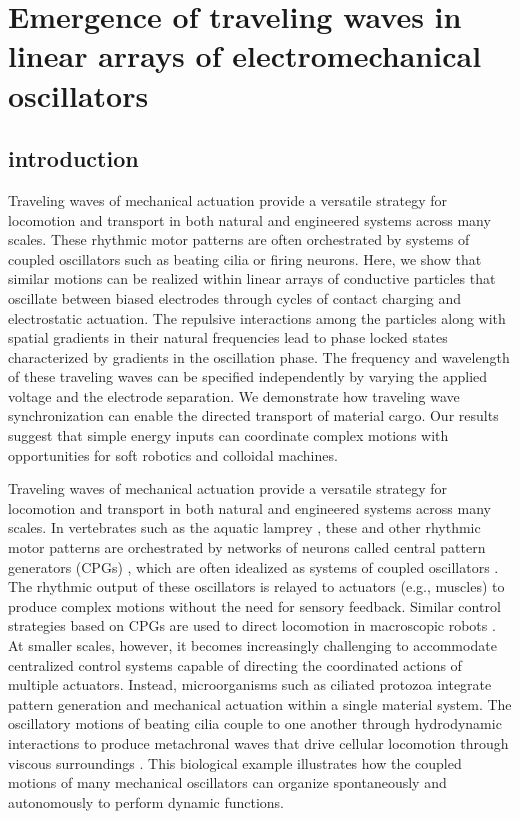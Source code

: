 \chapter{Emergence of traveling waves in linear arrays of electromechanical oscillators}




\section{introduction}
Traveling waves of mechanical actuation provide a versatile strategy for locomotion and transport in both natural and engineered systems across many scales. These rhythmic motor patterns are often orchestrated by systems of coupled oscillators such as beating cilia or firing neurons. Here, we show that similar motions can be realized within linear arrays of conductive particles that oscillate between biased electrodes through cycles of contact charging and electrostatic actuation. The repulsive interactions among the particles along with spatial gradients in their natural frequencies lead to phase locked states characterized by gradients in the oscillation phase. The frequency and wavelength of these traveling waves can be specified independently by varying the applied voltage and the electrode separation. We demonstrate how traveling wave synchronization can enable the directed transport of material cargo. Our results suggest that simple energy inputs can coordinate complex motions with opportunities for soft robotics and colloidal machines.

Traveling waves of mechanical actuation provide a versatile strategy for locomotion and transport in both natural\autocite{Cohen1982, Blake1974, Taylor447} and engineered\autocite{Ijspeert2008, Palagi2016, Park2016, Masuda2016, Yashin2012} systems across many scales. In vertebrates such as the aquatic lamprey \autocite{Cohen1982, Cohen1992}, these and other rhythmic motor patterns are orchestrated by networks of neurons called central pattern generators (CPGs) \autocite{Marder2001}, which are often idealized as systems of coupled oscillators \autocite{Cohen1982, Cohen1992}. The rhythmic output of these oscillators is relayed to actuators (e.g., muscles) to produce complex motions without the need for sensory feedback. Similar control strategies based on CPGs are used to direct  locomotion in macroscopic robots \autocite{Ijspeert2008}. At smaller scales, however, it becomes increasingly challenging to accommodate centralized control systems capable of directing the coordinated actions of multiple actuators. Instead, microorganisms such as ciliated protozoa integrate pattern generation and mechanical actuation within a single material system.  The oscillatory motions of beating cilia couple to one another through hydrodynamic interactions to produce metachronal waves that drive cellular locomotion through viscous surroundings \autocite{Blake1974, Niedermayer2008, Elgeti2013}. This biological example illustrates how the coupled motions of many mechanical oscillators can organize spontaneously and autonomously to perform dynamic functions.

